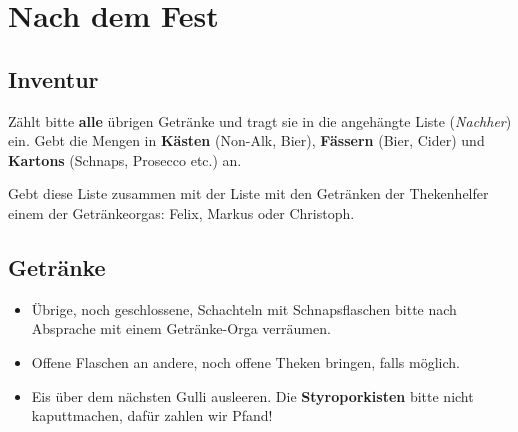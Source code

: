 \section{Nach dem Fest}
\subsection{Inventur}
Zählt bitte \textbf{alle} übrigen Getränke und tragt sie in die angehängte Liste (\emph{Nachher}) ein. Gebt die Mengen in \textbf{Kästen} (Non-Alk, Bier), \textbf{Fässern} (Bier, Cider) und \textbf{Kartons} (Schnaps, Prosecco etc.) an.

Gebt diese Liste zusammen mit der Liste mit den Getränken der Thekenhelfer einem der Getränkeorgas: Felix, Markus oder Christoph.
\subsection{Getränke}
\begin{itemize}
  \item Übrige, noch geschlossene, Schachteln mit Schnapsflaschen bitte nach Absprache mit einem Getränke-Orga verräumen.
  \item Offene Flaschen an andere, noch offene Theken bringen, falls möglich.
  \item Eis über dem nächsten Gulli ausleeren. Die \textbf{Styroporkisten} bitte nicht kaputtmachen, dafür zahlen wir Pfand!
\end{itemize}
